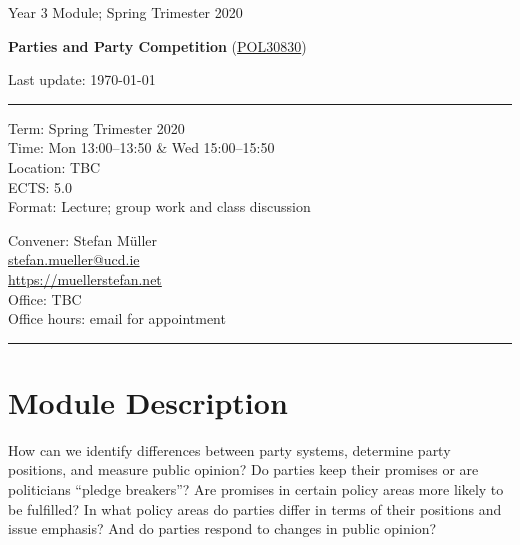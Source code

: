 \documentclass[abstract=on,parskip=full,headings=standardclasses,fontsize=11pt,paper=a4]{scrartcl}
\begin{document}
\singlespacing
\vspace{1cm}

\begin{center}
{\large Year 3 Module; 
Spring Trimester 2020} \\ 
\bigskip

{\Large \textbf{Parties and Party Competition} (\href{https://sisweb.ucd.ie/usis/!W_HU_MENU.P_PUBLISH?p_tag=MODULE&MODULE=POL30830}{POL30830})} 
\bigskip


{\large  {Last update: \today}}\\
\bigskip

\end{center}

\vspace{1.5cm}



\hrule
\medskip
\begin{minipage}[t]{0.5\textwidth}
Term: Spring Trimester 2020 \\
Time: Mon 13:00--13:50 \& Wed 15:00--15:50 \\
Location:  TBC \\
ECTS: 5.0 \\
Format: Lecture; group work and class discussion
\end{minipage}
\begin{minipage}[t]{0.49\textwidth}
\begin{flushright}
Convener: Stefan Müller \\
 \href{mailto:stefan.mueller@ucd.ie}{\textsf{stefan.mueller@ucd.ie}} \\
 \url{https://muellerstefan.net} \\
Office:  TBC \\
Office hours: email for appointment
\end{flushright}
\end{minipage}
\medskip
\hrule 

\section*{Module Description}

How can we  identify differences between party systems, determine party positions, and measure public opinion?  
Do parties keep their promises or are politicians ``pledge breakers''? Are promises in certain policy areas more likely to be fulfilled? In what policy areas do parties differ in terms of their positions and issue emphasis? And do parties respond to changes in public opinion?  
\end{document}
